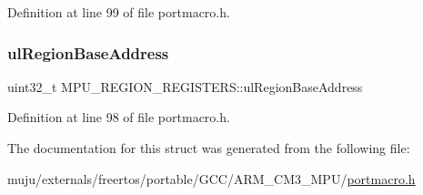 Definition at line 99 of file portmacro.\+h.

\mbox{\label{struct_m_p_u___r_e_g_i_o_n___r_e_g_i_s_t_e_r_s_a31d889401a490033e2224d9a90934eb1}} 
\subsubsection{\texorpdfstring{ul\+Region\+Base\+Address}{ulRegionBaseAddress}}
{\footnotesize\ttfamily uint32\+\_\+t M\+P\+U\+\_\+\+R\+E\+G\+I\+O\+N\+\_\+\+R\+E\+G\+I\+S\+T\+E\+R\+S\+::ul\+Region\+Base\+Address}



Definition at line 98 of file portmacro.\+h.



The documentation for this struct was generated from the following file\+:\begin{DoxyCompactItemize}
\item 
muju/externals/freertos/portable/\+G\+C\+C/\+A\+R\+M\+\_\+\+C\+M3\+\_\+\+M\+P\+U/\hyperlink{externals_2freertos_2portable_2_g_c_c_2_a_r_m___c_m3___m_p_u_2portmacro_8h}{portmacro.\+h}\end{DoxyCompactItemize}
